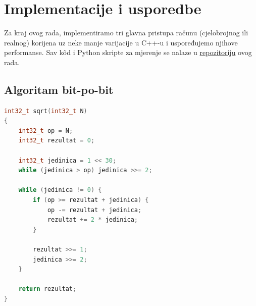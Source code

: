 \documentclass[12pt]{scrartcl}
\begin{document}
\section{Implementacije i usporedbe}
Za kraj ovog rada, implementiramo tri glavna pristupa računu (cjelobrojnog ili realnog) korijena uz neke manje varijacije
u C++-u i uspoređujemo njihove performanse. Sav k\^od i Python skripte za mjerenje se nalaze u
\href{https://github.com/mraguzin/mathsoft-esej2}{repozitoriju} ovog rada.

\subsection{Algoritam bit-po-bit}
\begin{lstlisting}[language=C++, caption=Bit-po-bit algoritam u C++-u]
int32_t sqrt(int32_t N)
{
	int32_t op = N;
	int32_t rezultat = 0;

	int32_t jedinica = 1 << 30;
	while (jedinica > op) jedinica >>= 2;

	while (jedinica != 0) {
		if (op >= rezultat + jedinica) {
			op -= rezultat + jedinica;
			rezultat += 2 * jedinica;
		}

		rezultat >>= 1;
		jedinica >>= 2;
	}

	return rezultat;
}
\end{lstlisting}
\end{document}
